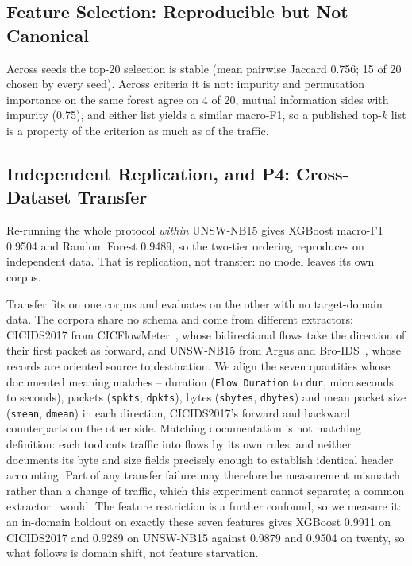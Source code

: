 \documentclass{llncs}
\newcommand{\inputtable}[1]{%
  \IfFileExists{tables/#1.tex}{}{}}
\begin{document}
\inputtable{leave_one_out}

\subsection{Feature Selection: Reproducible but Not Canonical}
\label{sec:featstab}
Across seeds the top-20 selection is stable (mean pairwise Jaccard 0.756; 15
of 20 chosen by every seed). Across criteria it is not: impurity and
permutation importance on the same forest agree on 4 of 20, mutual
information sides with impurity (0.75), and either list yields a similar
macro-F1, so a published top-$k$ list is a property of the criterion as much
as of the traffic.

\subsection{Independent Replication, and P4: Cross-Dataset Transfer}
\label{sec:transfer}
Re-running the whole protocol \emph{within} UNSW-NB15 gives XGBoost macro-F1
0.9504 and Random Forest 0.9489, so the two-tier ordering reproduces on
independent data. That is replication, not transfer: no model leaves its own
corpus.

Transfer fits on one corpus and evaluates on the other with no target-domain
data. The corpora share no schema and come from different extractors:
CICIDS2017 from CICFlowMeter~\cite{sharafaldin2018cicids}, whose
bidirectional flows take the direction of their first packet as forward,
and UNSW-NB15 from Argus and Bro-IDS~\cite{moustafa2015unswnb15}, whose
records are oriented source to destination. We align the seven quantities
whose documented meaning matches -- duration (\texttt{Flow Duration} to
\texttt{dur}, microseconds to seconds), packets (\texttt{spkts},
\texttt{dpkts}), bytes (\texttt{sbytes}, \texttt{dbytes}) and mean packet
size (\texttt{smean}, \texttt{dmean}) in each direction, CICIDS2017's
forward and backward counterparts on the other side. Matching documentation is not matching definition:
each tool cuts traffic into flows by its own rules, and neither documents
its byte and size fields precisely enough to establish identical header
accounting. Part of any transfer failure may therefore be measurement
mismatch rather than a change of traffic, which this experiment cannot
separate; a common extractor~\cite{sarhan2022standard} would. The feature
restriction is a further confound, so we measure it: an
in-domain holdout on exactly these seven features gives XGBoost 0.9911 on
CICIDS2017 and 0.9289 on UNSW-NB15 against 0.9879 and 0.9504 on twenty, so
what follows is domain shift, not feature starvation.
\end{document}
